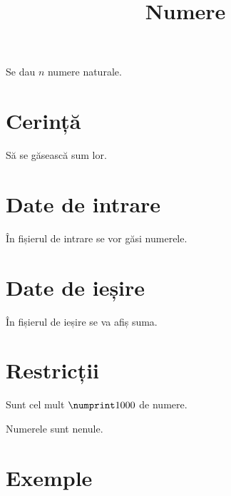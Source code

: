 \documentclass{problem}
\title{Numere}
\begin{document}
\maketitle

Se dau $n$ numere naturale.

\section{Cerință}

Să se găsească sum lor.

\section{Date de intrare}
În fișierul de intrare  se vor găsi numerele.

\section{Date de ieșire}
În fișierul de ieșire  se va afiș suma.

\section{Restricții}

\begin{constraints}
    \item Sunt cel mult $\np{1000}$ de numere.
    \item Numerele sunt nenule.
\end{constraints}

\begin{subtasks}
\end{subtasks}

\section{Exemple}

\begin{examples}
\end{examples}
\end{document}
